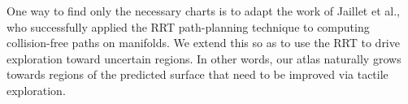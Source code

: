 One way to find only the necessary charts is to adapt the work of Jaillet et al.\cite{Jaillet2013Path}, who successfully applied the RRT path-planning technique to computing collision-free paths on manifolds. We extend this so as to use the RRT to drive exploration toward uncertain regions. In other words, our atlas naturally grows towards regions of the predicted surface that need to be improved via tactile exploration. %






